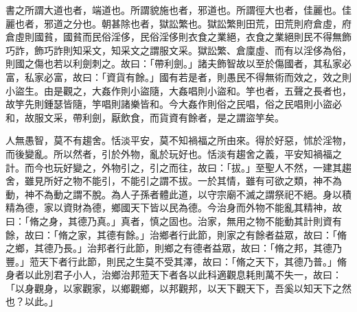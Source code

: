 \begin{pinyinscope}
書之所謂大道也者，端道也。所謂貌施也者，邪道也。所謂徑大也者，佳麗也。佳麗也者，邪道之分也。朝甚除也者，獄訟繁也。獄訟繁則田荒，田荒則府倉虛，府倉虛則國貧，國貧而民俗淫侈，民俗淫侈則衣食之業絕，衣食之業絕則民不得無飾巧詐，飾巧詐則知采文，知采文之謂服文采。獄訟繁、倉廩虛、而有以淫侈為俗，則國之傷也若以利劍刺之。故曰：「帶利劍。」諸夫飾智故以至於傷國者，其私家必富，私家必富，故曰：「資貨有餘。」國有若是者，則愚民不得無術而效之，效之則小盜生。由是觀之，大姦作則小盜隨，大姦唱則小盜和。竽也者，五聲之長者也，故竽先則鍾瑟皆隨，竽唱則諸樂皆和。今大姦作則俗之民唱，俗之民唱則小盜必和，故服文采，帶利劍，厭飲食，而貨資有餘者，是之謂盜竽矣。

人無愚智，莫不有趨舍。恬淡平安，莫不知禍福之所由來。得於好惡，怵於淫物，而後變亂。所以然者，引於外物，亂於玩好也。恬淡有趨舍之義，平安知禍福之計。而今也玩好變之，外物引之，引之而往，故曰：「拔。」至聖人不然，一建其趨舍，雖見所好之物不能引，不能引之謂不拔。一於其情，雖有可欲之類，神不為動，神不為動之謂不脫。為人子孫者體此道，以守宗廟不滅之謂祭祀不絕。身以積精為德，家以資財為德，鄉國天下皆以民為德。今治身而外物不能亂其精神，故曰：「脩之身，其德乃真。」真者，慎之固也。治家，無用之物不能動其計則資有餘，故曰：「脩之家，其德有餘。」治鄉者行此節，則家之有餘者益眾，故曰：「脩之鄉，其德乃長。」治邦者行此節，則鄉之有德者益眾，故曰：「脩之邦，其德乃豐。」蒞天下者行此節，則民之生莫不受其澤，故曰：「脩之天下，其德乃普。」脩身者以此別君子小人，治鄉治邦蒞天下者各以此科適觀息耗則萬不失一，故曰：「以身觀身，以家觀家，以鄉觀鄉，以邦觀邦，以天下觀天下，吾奚以知天下之然也？以此。」


\end{pinyinscope}